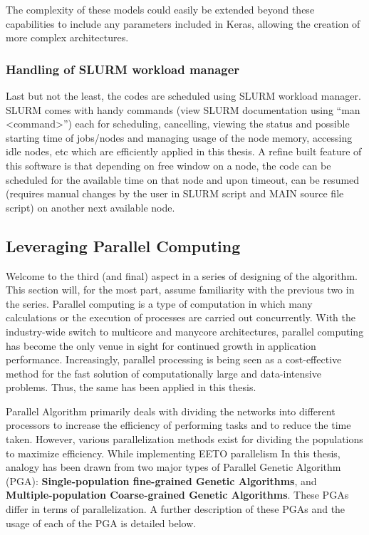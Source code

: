 The complexity of these models could easily be extended beyond these capabilities to include any parameters included in Keras, allowing the creation of more complex architectures.



\subsubsection{Handling of SLURM workload manager}

Last but not the least, the codes are scheduled using SLURM workload manager.  SLURM comes with handy commands (view SLURM documentation using “man <command>”) each for scheduling, cancelling, viewing the status and possible starting time of jobs/nodes and managing usage of the node memory, accessing idle nodes, etc which are efficiently applied in this thesis. 
A refine built feature of this software is that depending on free window on a node, the code can be scheduled for the available time on that node and upon timeout, can be resumed (requires manual changes by the user in SLURM script and MAIN source file script) on another next available node. 


\subsection{Leveraging Parallel Computing}

Welcome to the third (and final) aspect in a series of designing of the algorithm. This section will, for the most part, assume familiarity with the previous two in the series.
Parallel computing is a type of computation in which many calculations or the execution of processes are carried out concurrently\cite{almasi1988highly}. With the industry-wide switch to multicore and manycore architectures, parallel computing has become the only venue in sight for continued growth in application performance\cite{hwu2014ahead}. Increasingly, parallel processing is being seen as a cost-effective method for the fast solution of computationally large and data-intensive problems\cite{kumar1994introduction}. Thus, the same has been applied in this thesis.


Parallel Algorithm primarily deals with dividing the networks into different processors to increase the efficiency of performing tasks and to reduce the time taken. However, various parallelization methods exist for dividing the populations to maximize efficiency. While implementing EETO parallelism In this thesis, analogy has been drawn from two major types of Parallel Genetic Algorithm (PGA): \textbf{Single-population fine-grained Genetic Algorithms}, and \textbf{Multiple-population Coarse-grained Genetic Algorithms}. These PGAs differ in terms of parallelization. A further description of these PGAs and the usage of each of the PGA is detailed below.


